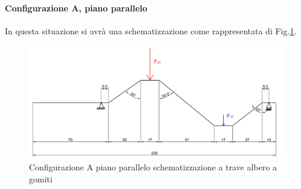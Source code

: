 \paragraph{Configurazione A, piano parallelo}
In questa situazione si avrà una schematizzazione come rappresentata di Fig.\ref{fig:SchemaAlberoAPar}.
\begin{figure}[h]
    \centering
    \includegraphics[scale=0.5]{Immagini/SchemaAlberoAPar.png}
    \caption{Configurazione A piano parallelo schematizzazione a trave albero a gomiti}
    \label{fig:SchemaAlberoAPar}
\end{figure}

